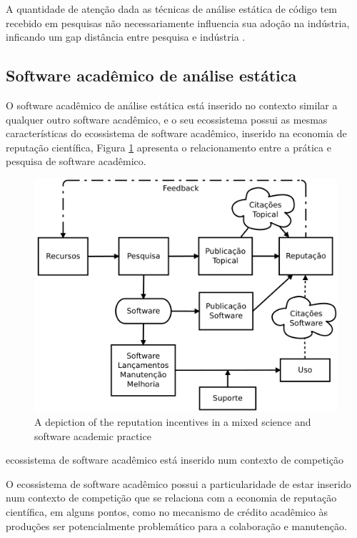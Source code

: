 A quantidade de atenção dada as técnicas de análise estática de código tem
recebido em pesquisas não necessariamente influencia sua adoção na indústria,
inficando um gap distância entre pesquisa e indústria \cite{ilyas2016static}.

\subsection{Software acadêmico de análise estática}

O software acadêmico de análise estática está inserido no contexto similar
a qualquer outro software acadêmico, e o seu ecossistema possui as mesmas
características do ecossistema de software acadêmico, inserido na economia
de reputação científica, Figura \ref{scientific-reputation-diagram} apresenta
o relacionamento entre a prática e pesquisa de software acadêmico.

\begin{figure}[h]
  \center
  \includegraphics[scale=0.5]{imagens/scientific-reputation-diagram.png}
  \caption{A depiction of the reputation incentives in a mixed science and software academic practice \cite{howison2011scientific}}
  \label{scientific-reputation-diagram}
\end{figure}

ecossistema de software acadêmico está inserido num contexto de competição

O ecossistema de software acadêmico possui a particularidade de estar inserido
num contexto de competição que se relaciona com a economia de reputação
científica, em alguns pontos, como no mecanismo de crédito acadêmico às
produções ser potencialmente problemático para a colaboração e manutenção.

